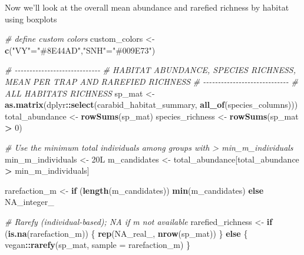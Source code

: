 \documentclass[
]{article}
\newenvironment{Shaded}{\begin{snugshade}}{\end{snugshade}}
\newcommand{\AttributeTok}[1]{\textcolor[rgb]{0.13,0.29,0.53}{#1}}
\newcommand{\CommentTok}[1]{\textcolor[rgb]{0.56,0.35,0.01}{\textit{#1}}}
\newcommand{\ConstantTok}[1]{\textcolor[rgb]{0.56,0.35,0.01}{#1}}
\newcommand{\ControlFlowTok}[1]{\textcolor[rgb]{0.13,0.29,0.53}{\textbf{#1}}}
\newcommand{\DataTypeTok}[1]{\textcolor[rgb]{0.13,0.29,0.53}{#1}}
\newcommand{\DecValTok}[1]{\textcolor[rgb]{0.00,0.00,0.81}{#1}}
\newcommand{\FunctionTok}[1]{\textcolor[rgb]{0.13,0.29,0.53}{\textbf{#1}}}
\newcommand{\NormalTok}[1]{#1}
\newcommand{\OtherTok}[1]{\textcolor[rgb]{0.56,0.35,0.01}{#1}}
\newcommand{\SpecialCharTok}[1]{\textcolor[rgb]{0.81,0.36,0.00}{\textbf{#1}}}
\newcommand{\StringTok}[1]{\textcolor[rgb]{0.31,0.60,0.02}{#1}}
\begin{document}
Now we'll look at the overall mean abundance and rarefied richness by
habitat using boxplots

\begin{Shaded}
\begin{Highlighting}[]
\CommentTok{\# define custom colors}
\NormalTok{custom\_colors }\OtherTok{\textless{}{-}} \FunctionTok{c}\NormalTok{(}\StringTok{"VY"}\OtherTok{=}\StringTok{"\#8E44AD"}\NormalTok{,}\StringTok{"SNH"}\OtherTok{=}\StringTok{"\#009E73"}\NormalTok{)}

\CommentTok{\# {-}{-}{-}{-}{-}{-}{-}{-}{-}{-}{-}{-}{-}{-}{-}{-}{-}{-}{-}{-}{-}{-}{-}{-}{-}{-}{-}{-}{-}}
\CommentTok{\# HABITAT ABUNDANCE, SPECIES RICHNESS, MEAN PER TRAP AND RAREFIED RICHNESS}
\CommentTok{\# {-}{-}{-}{-}{-}{-}{-}{-}{-}{-}{-}{-}{-}{-}{-}{-}{-}{-}{-}{-}{-}{-}{-}{-}{-}{-}{-}{-}{-}}
\CommentTok{\# ALL HABITATS RICHNESS}
\NormalTok{sp\_mat            }\OtherTok{\textless{}{-}} \FunctionTok{as.matrix}\NormalTok{(dplyr}\SpecialCharTok{::}\FunctionTok{select}\NormalTok{(carabid\_habitat\_summary, }\FunctionTok{all\_of}\NormalTok{(species\_columns)))}
\NormalTok{total\_abundance   }\OtherTok{\textless{}{-}} \FunctionTok{rowSums}\NormalTok{(sp\_mat)}
\NormalTok{species\_richness  }\OtherTok{\textless{}{-}} \FunctionTok{rowSums}\NormalTok{(sp\_mat }\SpecialCharTok{\textgreater{}} \DecValTok{0}\NormalTok{)}

\CommentTok{\#   Use the minimum total individuals among groups with \textgreater{} min\_m\_individuals}
\NormalTok{min\_m\_individuals }\OtherTok{\textless{}{-}} \DecValTok{20}\DataTypeTok{L}
\NormalTok{m\_candidates      }\OtherTok{\textless{}{-}}\NormalTok{ total\_abundance[total\_abundance }\SpecialCharTok{\textgreater{}}\NormalTok{ min\_m\_individuals]}

\NormalTok{rarefaction\_m }\OtherTok{\textless{}{-}} \ControlFlowTok{if}\NormalTok{ (}\FunctionTok{length}\NormalTok{(m\_candidates)) }\FunctionTok{min}\NormalTok{(m\_candidates) }\ControlFlowTok{else} \ConstantTok{NA\_integer\_}

\CommentTok{\# Rarefy (individual{-}based); NA if m not available}
\NormalTok{rarefied\_richness }\OtherTok{\textless{}{-}} \ControlFlowTok{if}\NormalTok{ (}\FunctionTok{is.na}\NormalTok{(rarefaction\_m)) \{}
  \FunctionTok{rep}\NormalTok{(}\ConstantTok{NA\_real\_}\NormalTok{, }\FunctionTok{nrow}\NormalTok{(sp\_mat))}
\NormalTok{\} }\ControlFlowTok{else}\NormalTok{ \{}
\NormalTok{  vegan}\SpecialCharTok{::}\FunctionTok{rarefy}\NormalTok{(sp\_mat, }\AttributeTok{sample =}\NormalTok{ rarefaction\_m)}
\NormalTok{\}}


\end{Highlighting}
\end{Shaded}
\end{document}
